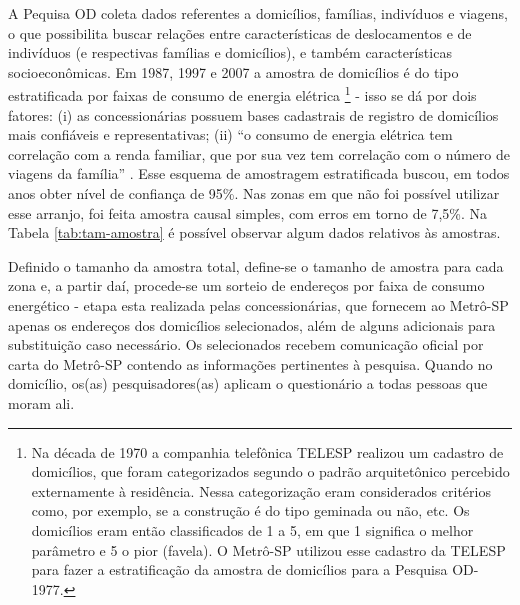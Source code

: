 A Pequisa OD coleta dados referentes a domicílios, famílias, indivíduos e viagens, o que possibilita buscar relações entre características de deslocamentos e de indivíduos (e respectivas famílias e domicílios), e também características socioeconômicas. Em 1987, 1997 e 2007 a amostra de domicílios é do tipo estratificada por faixas de consumo de energia elétrica%
\footnote{Na década de 1970 a companhia telefônica TELESP realizou um cadastro de domicílios, que foram categorizados segundo o padrão arquitetônico percebido externamente à residência. Nessa categorização eram considerados critérios como, por exemplo, se a construção é do tipo geminada ou não, etc. Os domicílios eram então classificados de 1 a 5, em que 1 significa o melhor parâmetro e 5 o pior (favela). O Metrô-SP utilizou esse cadastro da TELESP para fazer a estratificação da amostra de domicílios para a Pesquisa OD-1977.} - isso se dá por dois fatores: (i) as concessionárias possuem bases cadastrais de registro de domicílios mais confiáveis e representativas; (ii) ``o consumo de energia elétrica tem correlação com a renda familiar, que por sua vez tem correlação com o número de viagens da família'' \cite[p.10]{MANUALOD2007}. Esse esquema de amostragem estratificada buscou, em todos anos obter nível de confiança de 95\%. Nas zonas em que não foi possível utilizar esse arranjo, foi feita amostra causal simples, com erros em torno de 7,5\%. Na Tabela \ref{tab:tam-amostra} é possível observar algum dados relativos às amostras.

Definido o tamanho da amostra total, define-se o tamanho de amostra para cada zona e, a partir daí, procede-se um sorteio de endereços por faixa de consumo energético - etapa esta realizada pelas concessionárias, que fornecem ao Metrô-SP apenas os endereços dos domicílios selecionados, além de alguns adicionais para substituição caso necessário. Os selecionados recebem comunicação oficial por carta do Metrô-SP contendo as informações pertinentes à pesquisa. Quando no domicílio, os(as) pesquisadores(as) aplicam o questionário a todas pessoas que moram ali.


